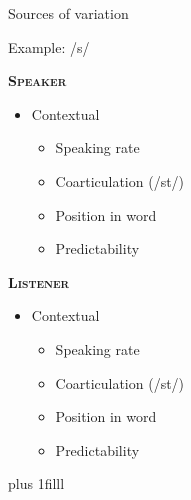 \documentclass{beamer}
\newcommand{\btVFill}{\vskip0pt plus 1filll}
\begin{document}
\begin{frame}{Sources of variation}

Example: /s/

\begin{minipage}[t]{0.45\textwidth}
\textbf{\textsc{Speaker}}

\begin{itemize}
\item Contextual
\begin{itemize}
\item Speaking rate
\item Coarticulation (/st\textturnr/)
\item Position in word
\item Predictability
\end{itemize}

\end{itemize}
\end{minipage}
\hfill
\begin{minipage}[t]{0.45\textwidth}
\textbf{\textsc{Listener}}

\begin{itemize}
\item Contextual
\begin{itemize}
\item Speaking rate
\item Coarticulation (/st\textturnr/)
\item Position in word
\item Predictability
\end{itemize}
\end{itemize}
\end{minipage}
\btVFill
\begin{flushright}
\scriptsize
\citet{Lieberman1963,Kraljic2008a,Clopper2008, Pitt2012}
\end{flushright}
\end{frame}
\end{document}
